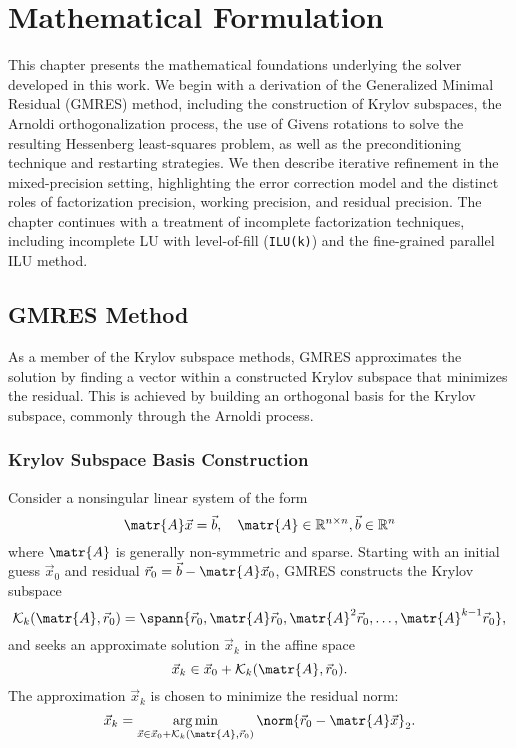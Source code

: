 \chapter{Mathematical Formulation}
\label{cha:math-form}

This chapter presents the mathematical foundations underlying the solver
developed in this work. We begin with a derivation of the Generalized Minimal
Residual (GMRES) method, including the construction of Krylov subspaces, the
Arnoldi orthogonalization process, the use of Givens rotations to solve the
resulting Hessenberg least-squares problem, as well as the preconditioning
technique and restarting strategies. We then describe iterative refinement in
the mixed-precision setting, highlighting the error correction model and the
distinct roles of factorization precision, working precision, and residual
precision. The chapter continues with a treatment of incomplete factorization
techniques, including incomplete LU with level-of-fill (\texttt{ILU(k)}) and the
fine-grained parallel ILU method.

\section{GMRES Method}
\label{sec:gmres-algorithm}

As a member of the Krylov subspace methods, GMRES approximates the solution by
finding a vector within a constructed Krylov subspace that minimizes the
residual. This is achieved by building an orthogonal basis for the Krylov
subspace, commonly through the Arnoldi process.

\subsection{Krylov Subspace Basis Construction}
\label{sec:kryl-subsp-basis}

Consider a nonsingular linear system of the form
\begin{equation}
  \label{eq:axb}
  \matr{A} \vec{x} = \vec{b}, \quad \matr{A} \in \mathbb{R}^{n \times n}, \vec{b} \in \mathbb{R}^n
\end{equation}
where \(\matr{A}\) is generally non-symmetric and sparse. Starting with an
initial guess \(\vec{x}_0\) and residual \(\vec{r}_0 = \vec{b} - \matr{A}
\vec{x}_0\), GMRES constructs the Krylov subspace
\begin{equation}
  \label{eq:krylov}
  \mathcal{K}_k(\matr{A}, \vec{r}_0) = \spann{\vec{r}_0, \matr{A}\vec{r}_0, \matr{A}^2\vec{r}_0, \dots, \matr{A}^{k - 1}\vec{r}_0},
\end{equation}
and seeks an approximate solution \(\vec{x}_k\) in the affine space \[\vec{x}_k
  \in \vec{x}_0 + \mathcal{K}_k(\matr{A}, \vec{r}_0).\] The approximation
\(\vec{x}_k\) is chosen to minimize the residual norm:
\begin{equation}
  \label{eq:argmin}
  \vec{x}_k = \argmin_{\vec{x} \in \vec{x}_0 + \mathcal{K}_k(\matr{A}, \vec{r}_0)} \norm{\vec{r}_0 - \matr{A} \vec{x}}_2.
\end{equation}

